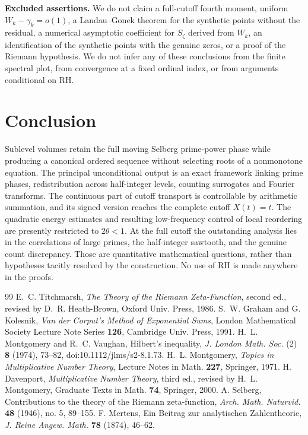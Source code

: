 \documentclass[11pt,leqno]{amsart}
\numberwithin{equation}{section}
\theoremstyle{definition}
\theoremstyle{remark}
\newcommand{\1}{\mathbf 1}
\begin{document}
\noindent\textbf{Excluded assertions.} We do not claim a full-cutoff fourth moment, uniform $W_k-\gamma_k=o(1)$, a Landau--Gonek theorem for the synthetic points without the residual, a numerical asymptotic coefficient for $S_\zeta$ derived from $W_k$, an identification of the synthetic points with the genuine zeros, or a proof of the Riemann hypothesis. We do not infer any of these conclusions from the finite spectral plot, from convergence at a fixed ordinal index, or from arguments conditional on RH.
\section{Conclusion}\label{sec:conclusion}
Sublevel volumes retain the full moving Selberg prime-power phase while producing a canonical ordered sequence without selecting roots of a nonmonotone equation. The principal unconditional output is an exact framework linking prime phases, redistribution across half-integer levels, counting surrogates and Fourier transforms. The continuous part of cutoff transport is controllable by arithmetic summation, and its signed version reaches the complete cutoff $X(t)=t$. The quadratic energy estimates and resulting low-frequency control of local reordering are presently restricted to $2\theta<1$. At the full cutoff the outstanding analysis lies in the correlations of large primes, the half-integer sawtooth, and the genuine count discrepancy. Those are quantitative mathematical questions, rather than hypotheses tacitly resolved by the construction. No use of RH is made anywhere in the proofs.
\begin{thebibliography}{99}
 E.~C. Titchmarsh, \emph{The Theory of the Riemann Zeta-Function}, second ed., revised by D.~R. Heath-Brown, Oxford Univ. Press, 1986.
 S.~W. Graham and G. Kolesnik, \emph{Van der Corput's Method of Exponential Sums}, London Mathematical Society Lecture Note Series \textbf{126}, Cambridge Univ. Press, 1991.
 H.~L. Montgomery and R.~C. Vaughan, Hilbert's inequality, \emph{J. London Math. Soc.} (2) \textbf{8} (1974), 73--82, doi:10.1112/jlms/s2-8.1.73.
 H.~L. Montgomery, \emph{Topics in Multiplicative Number Theory}, Lecture Notes in Math. \textbf{227}, Springer, 1971.
 H. Davenport, \emph{Multiplicative Number Theory}, third ed., revised by H.~L. Montgomery, Graduate Texts in Math. \textbf{74}, Springer, 2000.
 A. Selberg, Contributions to the theory of the Riemann zeta-function, \emph{Arch. Math. Naturvid.} \textbf{48} (1946), no. 5, 89--155.
 F. Mertens, Ein Beitrag zur analytischen Zahlentheorie, \emph{J. Reine Angew. Math.} \textbf{78} (1874), 46--62.
\end{thebibliography}
\end{document}
